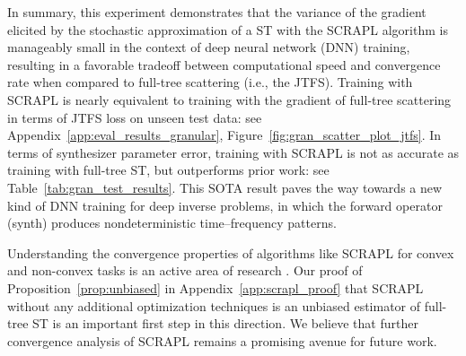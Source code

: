 \documentclass{article} %
\theoremstyle{plain}
\theoremstyle{definition}
\theoremstyle{remark}
\begin{document}
In summary, this experiment demonstrates that the variance of the gradient elicited by the stochastic approximation of a ST with the SCRAPL algorithm is manageably small in the context of deep neural network (DNN) training, resulting in a favorable tradeoff between computational speed and convergence rate when compared to full-tree scattering (i.e., the JTFS).
Training with SCRAPL is nearly equivalent to training with the gradient of full-tree scattering in terms of JTFS loss on unseen test data: see Appendix~\ref{app:eval_results_granular}, Figure~\ref{fig:gran_scatter_plot_jtfs}.
In terms of synthesizer parameter error, training with SCRAPL is not as accurate as training with full-tree ST, but outperforms prior work: see Table~\ref{tab:gran_test_results}.
This SOTA result paves the way towards a new kind of DNN training for deep inverse problems, in which the forward operator (synth) produces nondeterministic time--frequency patterns.

Understanding the convergence properties of algorithms like SCRAPL for convex and non-convex tasks is an active area of research \citep{sashank2016fast, sashank2018on, defossez2022a, kim2025adam}.
Our proof of Proposition~\ref{prop:unbiased} in Appendix~\ref{app:scrapl_proof} that SCRAPL without any additional optimization techniques is an unbiased estimator of full-tree ST is an important first step in this direction.
We believe that further convergence analysis of SCRAPL remains a promising avenue for future work.
\vspace{-3pt}

\end{document}
